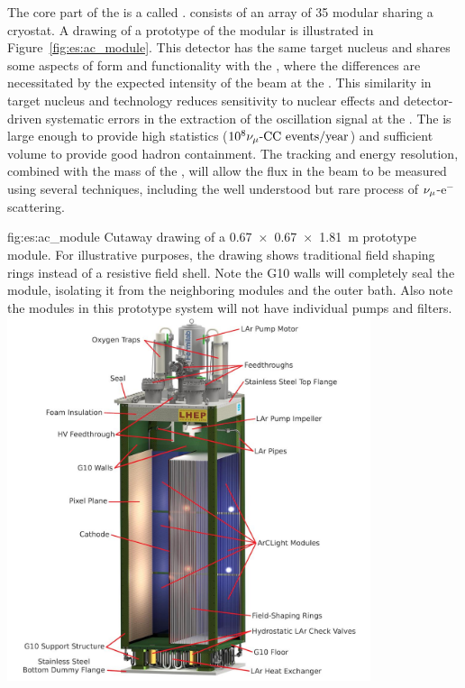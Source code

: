 The core part of the   is a  called .   consists of an array of 35 modular  sharing a cryostat.  A drawing of a prototype of the modular  is illustrated in Figure~\ref{fig:es:ac_module}.  
This detector has the same target nucleus and shares some aspects of form and functionality with the , where the differences are necessitated by the expected intensity of the beam at the .  This similarity in target nucleus and technology reduces sensitivity to nuclear effects and detector-driven systematic errors in the extraction of the oscillation signal at the  .  The  is large enough to provide high statistics %
($\num{e8}{\numu \text{-CC events/year}}$) and sufficient volume to provide good hadron containment.  The tracking and energy resolution, combined with the mass of the , will allow the flux in the beam to be measured using several techniques, including the well understood but rare process of $\nu_\mu$-e$^{-}$ scattering.

\begin{dunefigure}{fig:es:ac_module}
{Cutaway drawing of a \SI{0.67 x 0.67 x 1.81}{\metre}  prototype module. For illustrative purposes, the drawing shows traditional field shaping rings instead of a resistive field shell. Note the G10 walls will completely seal the module, isolating it from the neighboring modules and the outer  bath. Also note the modules in this prototype system will not have individual pumps and filters.}
\includegraphics[width=0.8\textwidth]{graphics/Normal-Module-4K_labelled.jpeg}
\end{dunefigure}

